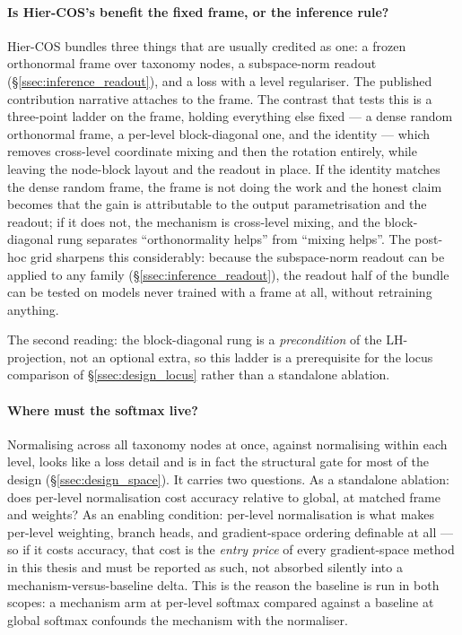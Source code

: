 \paragraph{Is Hier-COS's benefit the fixed frame, or the inference rule?} Hier-COS
bundles three things that are usually credited as one: a frozen orthonormal frame
over taxonomy nodes, a subspace-norm readout (\S\ref{ssec:inference_readout}), and
a loss with a level regulariser. The published contribution narrative attaches to
the frame. The contrast that tests this is a three-point ladder on the frame,
holding everything else fixed --- a dense random orthonormal frame, a per-level
block-diagonal one, and the identity --- which removes cross-level coordinate
mixing and then the rotation entirely, while leaving the node-block layout and the
readout in place. If the identity matches the dense random frame, the frame is not
doing the work and the honest claim becomes that the gain is attributable to the
output parametrisation and the readout; if it does not, the mechanism is
cross-level mixing, and the block-diagonal rung separates ``orthonormality helps''
from ``mixing helps''. The post-hoc grid sharpens this considerably: because the
subspace-norm readout can be applied to any family
(\S\ref{ssec:inference_readout}), the readout half of the bundle can be tested on
models never trained with a frame at all, without retraining anything.

The second reading: the block-diagonal rung is a \emph{precondition} of the
LH-projection, not an optional extra, so this ladder is a prerequisite for the
locus comparison of \S\ref{ssec:design_locus} rather than a standalone ablation.

\paragraph{Where must the softmax live?} Normalising across all taxonomy nodes at
once, against normalising within each level, looks like a loss detail and is in
fact the structural gate for most of the design (\S\ref{ssec:design_space}). It
carries two questions. As a standalone ablation: does per-level normalisation cost
accuracy relative to global, at matched frame and weights? As an enabling
condition: per-level normalisation is what makes per-level weighting, branch
heads, and gradient-space ordering definable at all --- so if it costs accuracy,
that cost is the \emph{entry price} of every gradient-space method in this thesis
and must be reported as such, not absorbed silently into a
mechanism-versus-baseline delta. This is the reason the baseline is run in both
scopes: a mechanism arm at per-level softmax compared against a baseline at global
softmax confounds the mechanism with the normaliser.

